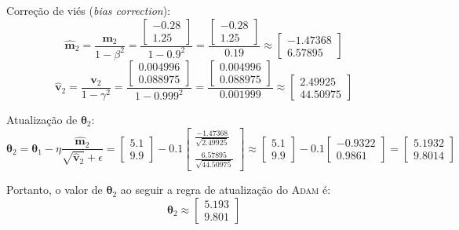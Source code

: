 \documentclass{dlproblemset}
\begin{document}
\begin{enumerate}[1)]
\begin{enumerate}
  Correção de viés (\textit{bias correction}):
    $$\hat{\mathbf{m}}_{2} = \frac{\mathbf{m}_{2}}{1 - \beta ^{2}} = \frac{\begin{bmatrix} -0.28\\ 1.25 \end{bmatrix}}{1 - 0.9^2} = \frac{\begin{bmatrix} -0.28\\ 1.25 \end{bmatrix}}{0.19} \approx \begin{bmatrix} -1.47368\\ 6.57895 \end{bmatrix}$$   $$\hat{\mathbf{v}}_{2} = \frac{\mathbf{v}_{2}}{1 - \gamma ^{2}} = \frac{\begin{bmatrix} 0.004996\\ 0.088975 \end{bmatrix}}{1 - 0.999^2} = \frac{\begin{bmatrix} 0.004996\\ 0.088975 \end{bmatrix}}{0.001999} \approx \begin{bmatrix} 2.49925\\ 44.50975 \end{bmatrix}$$

  Atualização de $\boldsymbol{\theta}_2$:
    $$\boldsymbol{\theta}_{2} = \boldsymbol{\theta}_{1} - \eta \frac{\hat{\mathbf{m}}_{2}}{\sqrt{\hat{\mathbf{v}}_{2}} + \epsilon} = \begin{bmatrix} 5.1\\ 9.9 \end{bmatrix} - 0.1\begin{bmatrix} \frac{-1.47368}{\sqrt{2.49925}}\\ \frac{6.57895}{\sqrt{44.50975}} \end{bmatrix} \approx \begin{bmatrix} 5.1\\ 9.9 \end{bmatrix} - 0.1\begin{bmatrix} -0.9322\\ 0.9861 \end{bmatrix} = \begin{bmatrix} 5.1932\\ 9.8014 \end{bmatrix}$$

Portanto, o valor de $\boldsymbol{\theta}_{2}$ ao seguir a regra de atualização do \textsc{Adam} é:
$$\boldsymbol{\theta}_{2} \approx \begin{bmatrix} 5.193\\ 9.801 \end{bmatrix}$$
    \end{enumerate}


\end{enumerate}
\end{document}

